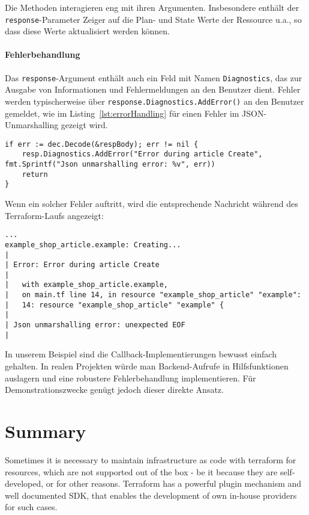 \documentclass[paper=a4,11pt,numbers=noenddot]{article}
\begin{document}
Die Methoden interagieren eng mit ihren Argumenten. Insbesondere enthält der \verb'response'-Parameter Zeiger auf die Plan- und State Werte der Ressource u.a., so dass diese Werte aktualisiert werden können.

\paragraph{Fehlerbehandlung}

Das \verb'response'-Argument enthält auch ein Feld mit Namen \verb'Diagnostics', das zur Ausgabe von Informationen und Fehlermeldungen an den Benutzer dient. Fehler werden typischerweise über \verb'response.Diagnostics.AddError()' an den Benutzer gemeldet, wie im Listing~\ref{lst:errorHandling} für einen Fehler im JSON-Unmarshalling gezeigt wird.

\begin{lstlisting}[label=lst:errorHandling]
if err := dec.Decode(&respBody); err != nil {
    resp.Diagnostics.AddError("Error during article Create", fmt.Sprintf("Json unmarshalling error: %v", err))
    return
}
\end{lstlisting}

Wenn ein solcher Fehler auftritt, wird die entsprechende Nachricht während des Terraform-Laufs angezeigt:

\begin{lstlisting}
...
example_shop_article.example: Creating...
|
| Error: Error during article Create
|
|   with example_shop_article.example,
|   on main.tf line 14, in resource "example_shop_article" "example":
|   14: resource "example_shop_article" "example" {
|
| Json unmarshalling error: unexpected EOF
|
\end{lstlisting}

In unserem Beispiel sind die Callback-Implementierungen bewusst einfach gehalten. In realen Projekten würde man Backend-Aufrufe in Hilfsfunktionen auslagern und eine robustere Fehlerbehandlung implementieren. Für Demonstrationszwecke genügt jedoch dieser direkte Ansatz.

\section{Summary}
\label{sec:summary}

Sometimes it is necessary to maintain infrastructure as code with terraform for resources, which are not supported out of the box - be it because they are self-developed, or for other reasons. Terraform has a powerful plugin mechanism and well documented SDK, that enables the development of own in-house providers for such cases.
\end{document}

